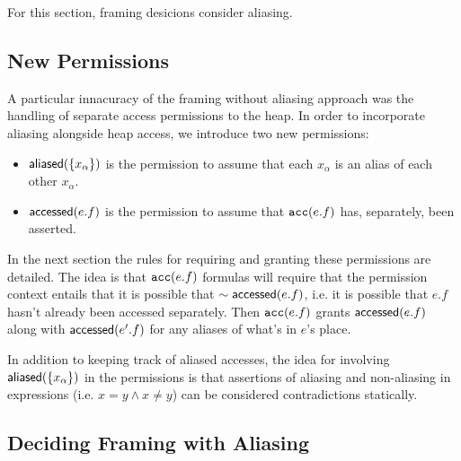 For this section, framing desicions  consider aliasing.

\subsection{New Permissions}

A particular innacuracy of the framing without aliasing approach was the handling of separate access permissions to the heap. In order to incorporate aliasing alongside heap access, we introduce two new permissions:
\begin{itemize}
\item
$\textsf{aliased}(\left\{  x_\alpha  \right\})$ is the permission to assume that each $x_\alpha$ is an alias of each other $x_\alpha$.
\item
$\textsf{accessed}(e.f)$ is the permission to assume that $\texttt{acc}(e.f)$ has, separately, been asserted.
\end{itemize}
In the next section the rules for requiring and granting these permissions are detailed. The idea is that $\texttt{acc}(e.f)$ formulas will require that the permission context entails that it is possible that $\sim \textsf{accessed}(e.f)$, i.e. it is possible that $e.f$ hasn't already been accessed separately. Then $\texttt{acc}(e.f)$ grants $\textsf{accessed}(e.f)$ along with $\textsf{accessed}(e^\prime .f)$ for any aliases of what's in $e$'s place.

In addition to keeping track of aliased accesses, the idea for involving $\textsf{aliased}(\left\{  x_\alpha  \right\})$ in the permissions is that assertions of aliasing and non-aliasing in expressions (i.e. $x = y \land x \neq y$) can be considered contradictions statically.

\newpage
\subsection{Deciding Framing with Aliasing}



